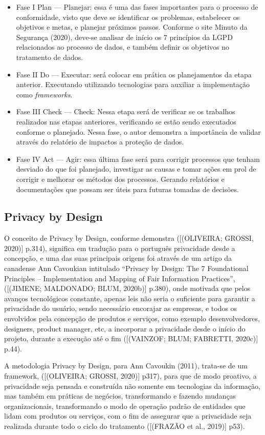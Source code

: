 \documentclass[
	12pt,				%
	openright,			%
	oneside,			%
	a4paper,			%
	english,			%
	french,				%
	spanish,			%
	brazil,				%
	]{abntex2}
\begin{document}
\begin{itemize}
\item Fase I  Plan — Planejar: essa é uma das fases importantes para o processo de conformidade, visto que deve se identificar os problemas, estabelecer os objetivos e metas, e planejar próximos passos. Conforme o site Minuto da Segurança (2020), deve-se analisar de início os 7 princípios da LGPD relacionados ao processo de dados, e também definir os objetivos no tratamento de dados.
\item Fase II Do — Executar: será colocar em prática os planejamentos da etapa anterior. Executando utilizando tecnologias para auxiliar a implementação como \textit{frameworks}.
\item Fase III Check — Check: Nessa etapa será de verificar se os trabalhos realizados nas etapas anteriores, verificando se estão sendo executados conforme o planejado. Nessa fase, o autor demonstra a importância de validar através do relatório de impactos a proteção de dados.
\item Fase IV Act — Agir:  essa última fase será para corrigir processos que tenham desviado do que foi planejado, investigar as causas e tomar ações em prol de corrigir e melhorar os métodos dos processos. Gerando relatórios e documentações que possam ser úteis para futuras tomadas de decisões.
\end{itemize}

\subsection{ Privacy by Design  }

O conceito de Privacy by Design, conforme demonstra ([(OLIVEIRA; GROSSI, 2020)] p.314),  significa em tradução para o português privacidade desde a concepção, e uma das suas principais origens foi através de um artigo da canadense Ann Cavoukian intitulado “Privacy by Design: The 7 Foundational Principles – Implementation and Mapping of Fair Information Practices”, ([(JIMENE; MALDONADO; BLUM, 2020b)] p.380), onde motivada que pelos avanços tecnológicos constante, apenas leis não seria o suficiente para garantir a privacidade do usuário, sendo necessário encorajar as empresas, e todos os envolvidos pela concepção de produtos e serviços, como exemplo desenvolvedores, designers, product manager, etc, a incorporar a privacidade desde o início do projeto, durante a execução até o fim ([(VAINZOF; BLUM; FABRETTI, 2020c)] p.44). 

A metodologia Privacy by Design, para Ann Cavoukin (2011), trata-se de um framework, ([(OLIVEIRA; GROSSI, 2020)] p317),  para que de modo proativo, a privacidade seja pensada e construída não somente em tecnologias da informação, mas também em práticas de negócios, transformando e fazendo mudanças organizacionais, transformando o modo de operação padrão de entidades que lidam com produtos ou serviços, com o fim de assegurar que a privacidade seja realizada durante todo o ciclo do tratamento ([(FRAZÃO et al., 2019)] p53).
\end{document}
